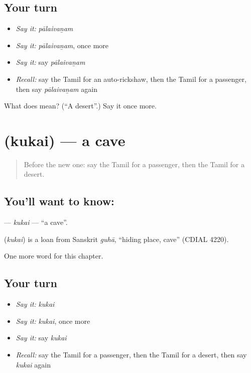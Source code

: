 \subsection*{Your turn}
\begin{itemize}
\raggedright
  \item \emph{Say it:} \emph{pālaivaṉam}
  \item \emph{Say it:} \emph{pālaivaṉam}, once more
  \item \emph{Say it:} say \emph{pālaivaṉam}
  \item \emph{Recall:} say the Tamil for an auto-rickshaw, then the Tamil for a passenger, then say \emph{pālaivaṉam} again
\end{itemize}

\begin{tcolorbox}[breakable,colback=teal!4,colframe=teal!35!black,title={Before you move on}]
What does  mean? (\textquotedblleft{}A desert\textquotedblright{}.) Say it once more.
\end{tcolorbox}
\section[\texorpdfstring{\ta{குகை} (kukai)}{குகை (kukai)}]{ (kukai) — a cave}

\label{lesson:TA-C175-kukai}



\begin{quote}
Before the new one: say the Tamil for a passenger, then the Tamil for a desert.
\end{quote}

\subsection*{You'll want to know: }
\textbf{} — \emph{kukai} — \textquotedblleft{}a cave\textquotedblright{}.

\begin{cousinweb}
\textbf{} (\emph{kukai}) is a loan from Sanskrit \emph{guhā}, \textquotedblleft{}hiding place, cave\textquotedblright{} (CDIAL 4220).
\end{cousinweb}

\begin{grammarlens}[title={What you've built}]
One more word for this chapter.
\end{grammarlens}

\subsection*{Your turn}
\begin{itemize}
\raggedright
  \item \emph{Say it:} \emph{kukai}
  \item \emph{Say it:} \emph{kukai}, once more
  \item \emph{Say it:} say \emph{kukai}
  \item \emph{Recall:} say the Tamil for a passenger, then the Tamil for a desert, then say \emph{kukai} again
\end{itemize}

